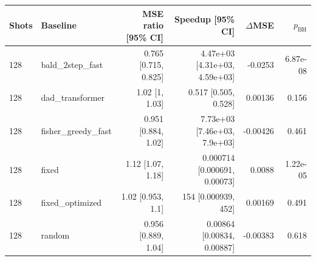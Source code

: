 \begin{tabular}{llrrrr}
\toprule
Shots & Baseline & MSE ratio [95\% CI] & Speedup [95\% CI] & $\Delta$MSE & $p_{\mathrm{BH}}$ \\
\midrule
128 & bald\_2step\_fast & 0.765 [0.715, 0.825] & 4.47e+03 [4.31e+03, 4.59e+03] & -0.0253 & 6.87e-08 \\
128 & dad\_transformer & 1.02 [1, 1.03] & 0.517 [0.505, 0.528] & 0.00136 & 0.156 \\
128 & fisher\_greedy\_fast & 0.951 [0.884, 1.02] & 7.73e+03 [7.46e+03, 7.9e+03] & -0.00426 & 0.461 \\
128 & fixed & 1.12 [1.07, 1.18] & 0.000714 [0.000691, 0.00073] & 0.0088 & 1.22e-05 \\
128 & fixed\_optimized & 1.02 [0.953, 1.1] & 154 [0.000939, 452] & 0.00169 & 0.491 \\
128 & random & 0.956 [0.889, 1.04] & 0.00864 [0.00834, 0.00887] & -0.00383 & 0.618 \\
\bottomrule
\end{tabular}
